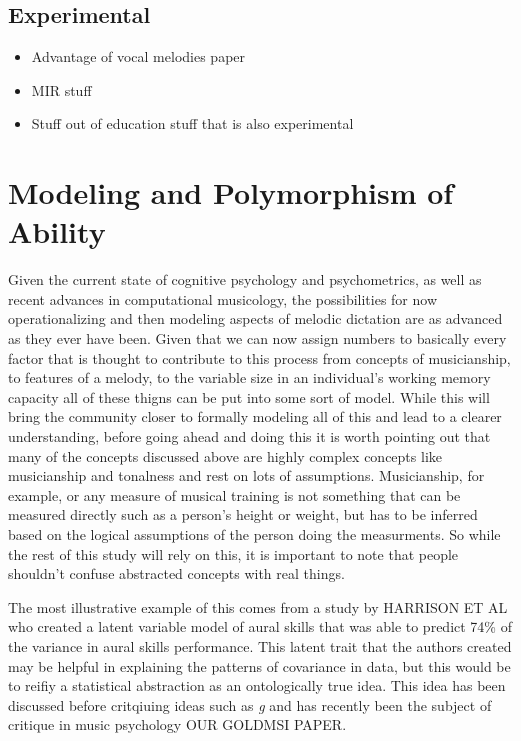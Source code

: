 \documentclass[]{book}
\providecommand{\tightlist}{%
  \setlength{\itemsep}{0pt}\setlength{\parskip}{0pt}}
\theoremstyle{definition}
\theoremstyle{definition}
\theoremstyle{definition}
\theoremstyle{remark}
\begin{document}
\hypertarget{experimental}{%
\subsection{Experimental}\label{experimental}}

\begin{itemize}
\tightlist
\item
  Advantage of vocal melodies paper
\item
  MIR stuff
\item
  Stuff out of education stuff that is also experimental
\end{itemize}

\hypertarget{modeling-and-polymorphism-of-ability}{%
\section{Modeling and Polymorphism of
Ability}\label{modeling-and-polymorphism-of-ability}}

Given the current state of cognitive psychology and psychometrics, as
well as recent advances in computational musicology, the possibilities
for now operationalizing and then modeling aspects of melodic dictation
are as advanced as they ever have been. Given that we can now assign
numbers to basically every factor that is thought to contribute to this
process from concepts of musicianship, to features of a melody, to the
variable size in an individual's working memory capacity all of these
thigns can be put into some sort of model. While this will bring the
community closer to formally modeling all of this and lead to a clearer
understanding, before going ahead and doing this it is worth pointing
out that many of the concepts discussed above are highly complex
concepts like musicianship and tonalness and rest on lots of
assumptions. Musicianship, for example, or any measure of musical
training is not something that can be measured directly such as a
person's height or weight, but has to be inferred based on the logical
assumptions of the person doing the measurments. So while the rest of
this study will rely on this, it is important to note that people
shouldn't confuse abstracted concepts with real things.

The most illustrative example of this comes from a study by HARRISON ET
AL who created a latent variable model of aural skills that was able to
predict 74\% of the variance in aural skills performance. This latent
trait that the authors created may be helpful in explaining the patterns
of covariance in data, but this would be to reifiy a statistical
abstraction as an ontologically true idea. This idea has been discussed
before critqiuing ideas such as \emph{g}
\citep{gouldMismeasureMan1996, kovacsProcessOverlapTheory2016} and has
recently been the subject of critique in music psychology OUR GOLDMSI
PAPER.
\end{document}
